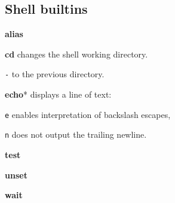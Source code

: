 \subsection{Shell builtins}
\textbf{alias}

\textbf{cd} changes the shell working directory.
\begin{enumx}
	\item [\texttt{-}] to the previous directory.
\end{enumx}

\textbf{echo}* displays a line of text:
\begin{enumx} 
	\item [\texttt{e}] enables interpretation of backslash escapes,
	\item [\texttt{n}] does not output the trailing newline.
\end{enumx}

\textbf{test}

\textbf{unset}

\textbf{wait}


